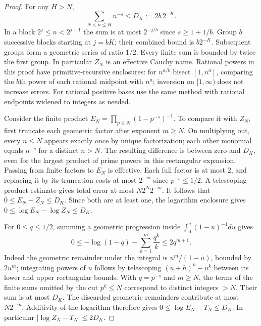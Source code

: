 \begin{proof}
For any $H>N$,
\[
 \sum_{N<n\le H}n^{-s}\le D_K:=2b\,2^{-K}.
\]
In a block $2^j\le n<2^{j+1}$ the sum is at most $2^{-j/b}$ since $s\ge1+1/b$. Group $b$ successive blocks starting at $j=bK$; their combined bound is $b2^{-K}$. Subsequent groups form a geometric series of ratio $1/2$. Every finite sum is bounded by twice the first group. In particular $Z_N$ is an effective Cauchy name. Rational powers in this proof have primitive-recursive enclosures: for $n^{a/b}$ bisect $[1,n^a]$, comparing the $b$th power of each rational midpoint with $n^a$; inversion on $[1,\infty)$ does not increase errors. For rational positive bases use the same method with rational endpoints widened to integers as needed.

Consider the finite product $E_N=\prod_{p\le N}(1-p^{-s})^{-1}$. To compare it with $Z_N$, first truncate each geometric factor after exponent $m\ge N$. On multiplying out, every $n\le N$ appears exactly once by unique factorization; each other monomial equals $n^{-s}$ for a distinct $n>N$. The resulting difference is between zero and $D_K$, even for the largest product of prime powers in this rectangular expansion. Passing from finite factors to $E_N$ is effective. Each full factor is at most $2$, and replacing it by its truncation costs at most $2^{-m}$ since $p^{-s}\le1/2$. A telescoping product estimate gives total error at most $N 2^N 2^{-m}$. It follows that $0\le E_N-Z_N\le D_K$. Since both are at least one, the logarithm enclosure gives $0\le\log E_N-\log Z_N\le D_K$.

For $0\le q\le1/2$, summing a geometric progression inside $\int_0^q(1-u)^{-1}du$ gives
\[
 0\le -\log(1-q)-\sum_{k=1}^{m}\frac{q^k}{k}
       \le 2q^{m+1}.
\]
Indeed the geometric remainder under the integral is $u^m/(1-u)$, bounded by $2u^m$; integrating powers of $u$ follows by telescoping $(u+h)^k-u^k$ between its lower and upper rectangular bounds. With $q=p^{-s}$ and $m\ge N$, the terms of the finite sums omitted by the cut $p^k\le N$ correspond to distinct integers $>N$. Their sum is at most $D_K$. The discarded geometric remainders contribute at most $N2^{-m}$. Additivity of the logarithm therefore gives $0\le\log E_N-T_N\le D_K$. In particular $|\log Z_N-T_N|\le2D_K$.


\end{proof}

